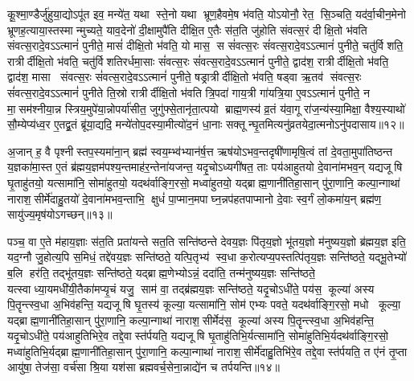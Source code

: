 कू॒श्मा॒ण्डैर्जु॑हुया॒द्योऽपू॑त इव॒ मन्ये॑त॒ यथा स्ते॒नो यथा भ्रूण॒हैवमे॒ष भ॑वति॒ योऽयोनौ॒ रेत॒ सि॒ञ्चति॒ यद॑र्वा॒चीन॒मेनो भ्रूणह॒त्याया॒स्तस्मान्मुच्यते॒ याव॒देनो॑ दी॒क्षामुपै॑ति दीक्षि॒त ए॒तैः स॑त॒ति जु॑होति संवत्स॒रं दीक्षि॒तो भ॑वति संवत्स॒रादे॒वऽऽत्मानं॑ पुनीते॒ मासं॑ दीक्षि॒तो भ॑वति॒ यो मास॒ स सं॑वत्स॒रः सं॑वत्स॒रादे॒वऽऽत्मानं॑ पुनीते॒ चतु॑र्विशति॒ रात्रीर्दीक्षि॒तो भ॑वति॒ चतु॑र्विशतिरर्धमा॒साः सं॑वत्स॒रः सं॑वत्स॒रादे॒वऽऽत्मानं॑ पुनीते॒ द्वाद॑श॒ रात्रीर्दीक्षि॒तो भ॑वति॒ द्वाद॑श॒ मासा संवत्स॒रः सं॑वत्स॒रादे॒वऽऽत्मानं॑ पुनीते॒ षड्रात्रीर्दीक्षि॒तो भ॑वति॒ षड्वा ऋ॒तव॑ संवत्स॒रः सं॑वत्स॒रादे॒वऽऽत्मानं॑ पुनीते ति॒स्रो रात्रीर्दीक्षि॒तो भ॑वति त्रि॒पदा॑ गाय॒त्री गा॑यत्रि॒या ए॒वऽऽत्मानं॑ पुनीते॒ न मा॒सम॑श्नीया॒न्न स्त्रिय॒मुपे॑या॒न्नोपर्या॑सीत॒ जुगु॑फ्से॒तानृ॑ता॒त्पयो ब्राह्म॒णस्य॑ व्र॒तं य॑वा॒गू रा॑ज॒न्य॑स्या॒मिक्षा॒ वैश्य॒स्याथो॑ सौ॒म्येप्य॑ध्व॒र ए॒तद्व्र॒तं ब्रू॑या॒द्यदि॒ मन्ये॑तोप॒दस्या॒मीत्यो॑द॒नं धा॒नाः सक्तून्घृ॒तमित्यनु॑व्रतयेदा॒त्मनोऽनु॑पदासाय॥१२॥ 
\anuvakamend


अ॒जान् ह॒ वै पृश्नीस्तप॒स्यमा॑ना॒न् ब्रह्म॑ स्वय॒म्भ्व॑भ्यान॑र्\mbox{}ष॒त्त ऋष॑योऽभव॒न्तदृषी॑णामृषि॒त्वं तां दे॒वता॒मुपा॑तिष्ठन्त य॒ज्ञका॑मा॒स्त ए॒तं ब्र॑ह्मय॒ज्ञम॑पश्य॒न्तमाह॑र॒न्तेना॑यजन्त॒ यदृ॒चोऽध्यगी॑षत॒ ताः पय॑आहुतयो दे॒वाना॑मभव॒न् यद्यजूषि घृ॒ताहु॑तयो॒ यत्सामा॑नि॒ सोमा॑हुतयो॒ यदथ॑र्वाङ्गि॒रसो॒ मध्वा॑हुतयो॒ यद्ब्राह्म॒णानी॑तिहा॒सान् पु॑रा॒णानि॒ कल्पा॒न्गाथा॑ नाराश॒सीर्मे॑दाहु॒तयो॑ दे॒वाना॑मभव॒न्ताभि॒ क्षुधं॑ पा॒प्मान॒मपाघ्न॒न्नप॑हतपाप्मानो दे॒वाः स्व॒र्गं लो॒कमा॑य॒न् ब्रह्म॑ण॒ सायु॑ज्य॒मृष॑योऽगच्छन्॥१३॥\anuvakamend

पञ्च॒ वा ए॒ते म॑हाय॒ज्ञाः स॑त॒ति प्रता॑यन्ते सत॒ति सन्ति॑ष्ठन्ते देवय॒ज्ञः पि॑तृय॒ज्ञो भू॑तय॒ज्ञो म॑नुष्यय॒ज्ञो ब्र॑ह्मय॒ज्ञ इति॒ यद॒ग्नौ जु॒होत्य॒पि स॒मिधं॒ तद्दे॑वय॒ज्ञः सन्ति॑ष्ठते॒ यत्पि॒तृभ्य॑ स्व॒धा क॒रोत्यप्य॒पस्तत्पि॑तृय॒ज्ञः सन्ति॑ष्ठते॒ यद्भू॒तेभ्यो॑ ब॒लि हर॑ति॒ तद्भू॑तय॒ज्ञः सन्ति॑ष्ठते॒ यद्ब्राह्म॒णेभ्योऽन्नं॒ ददा॑ति॒ तन्म॑नुष्यय॒ज्ञः सन्ति॑ष्ठते॒ यत्स्वाध्या॒यमधी॑यी॒तैका॑मप्यृ॒चं यजु॒ साम॑ वा॒ तद्ब्र॑ह्मय॒ज्ञः सन्ति॑ष्ठते॒ यदृ॒चोऽधी॑ते॒ पय॑स॒ कूल्या॑ अस्य पि॒तॄन्त्स्व॒धा अ॒भिव॑हन्ति॒ यद्यजूषि घृ॒तस्य॑ कूल्या॒ यत्सामा॑नि॒ सोम॑ एभ्यः पवते॒ यदथ॑र्वाङ्गि॒रसो॒ मधो कूल्या॒ यद्ब्राह्म॒णानी॑तिहा॒सान् पु॑रा॒णानि॒ कल्पा॒न्गाथा॑ नाराश॒सीर्मेद॑स॒ कूल्या॑ अस्य पि॒तॄन्त्स्व॒धा अ॒भिव॑हन्ति॒ यदृ॒चोऽधी॑ते॒ पय॑आहुतिभिरे॒व तद्दे॒वास्त॑र्पयति॒ यद्यजूषि घृ॒ताहु॑तिभि॒र्यत्सामा॑नि॒ सोमा॑हुतिभि॒र्यदथ॑र्वाङ्गि॒रसो॒ मध्वा॑हुतिभि॒र्यद्ब्राह्म॒णानी॑तिहा॒सान् पु॑रा॒णानि॒ कल्पा॒न्गाथा॑ नाराश॒सीर्मे॑दाहु॒तिभि॑रे॒व तद्दे॒वास्त॑र्पयति॒ त ए॑नं तृ॒प्ता आयु॑षा॒ तेज॑सा॒ वर्च॑सा श्रि॒या यश॑सा ब्रह्मवर्च॒सेना॒न्नाद्ये॑न च तर्पयन्ति॥१४॥
\anuvakamend


